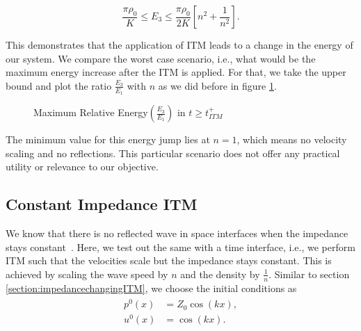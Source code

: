\begin{equation}
    \frac{\pi \rho_0}{K} \leq E_3 \leq \frac{\pi \rho_0}{2K}\left[n^2 + \frac{1}{n^2}\right] .
\end{equation}

This demonstrates that the application of \ac{ITM} leads to a change in the energy of our system. We compare the worst case scenario, i.e., what would be the maximum energy increase after the ITM is applied. For that,
 we take the upper bound and plot the ratio $\frac{E_3}{E_1}$ with $n$ as we did before in figure \ref{fig:ratio2}.

\begin{figure}[!htpb]
    \centering
    \caption{Maximum Relative Energy$\left(\frac{E_3}{E_1}\right)$ in $t \geq t_{ITM}^+$}
    \label{fig:ratio2}
\end{figure}

The minimum value for this energy jump lies at $n=1$, which means no velocity scaling and no reflections. This particular scenario does not offer any practical utility
or relevance to our objective.

\subsection{\texorpdfstring{Constant Impedance \ac{ITM}}{Constant Impedance ITM}}
We know that there is no reflected wave in space interfaces when the impedance stays constant~\parencite[Sec 9.7]{leveque_2002}. Here, we test out the same with a time interface, i.e., we perform \ac{ITM} such that the velocities scale but the impedance stays constant. This is achieved by scaling the wave speed by $n$ and the density by $\frac{1}{n}$.
Similar to section \ref{section:impedancechangingITM}, we choose the initial conditions as
\begin{align}
    \begin{split}
        p^0\left(x\right) &= Z_0 \cos\left(kx\right), \\
        u^0\left(x\right) &= \cos\left(kx\right) .
    \end{split}
    \label{eq:initialconditions2}
\end{align}

